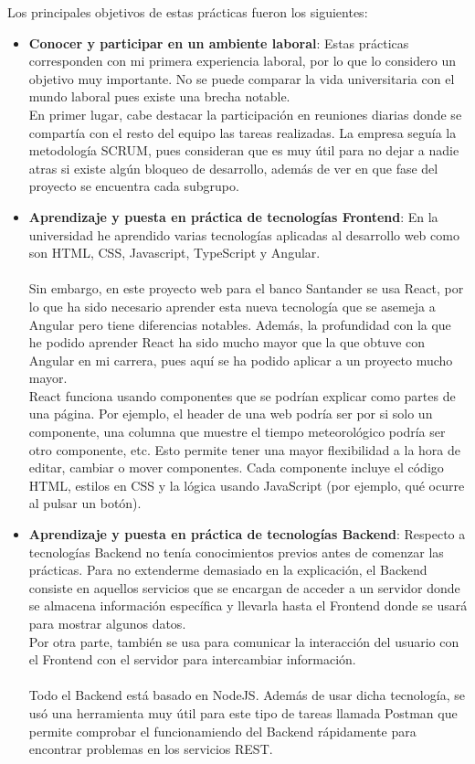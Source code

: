 \documentclass[a4paper,12pt]{article}
\begin{document}
Los principales objetivos de estas prácticas fueron los siguientes:
\begin{itemize}
\item \textbf{Conocer y participar en un ambiente laboral}: Estas prácticas corresponden con mi primera experiencia laboral, por lo que lo considero un objetivo muy importante. No se puede comparar la vida universitaria con el mundo laboral pues existe una brecha notable.\\

En primer lugar, cabe destacar la participación en reuniones diarias donde se compartía con el resto del equipo las tareas realizadas. La empresa seguía la metodología SCRUM, pues consideran que es muy útil para no dejar a nadie atras si existe algún bloqueo de desarrollo, además de ver en que fase del proyecto se encuentra cada subgrupo.

\item \textbf{Aprendizaje y puesta en práctica de tecnologías Frontend}:
En la universidad he aprendido varias tecnologías aplicadas al desarrollo web como son HTML, CSS, Javascript, TypeScript y
Angular. \\
\\Sin embargo, en este proyecto web para el banco Santander se usa React, por lo que ha sido necesario aprender esta nueva tecnología que se asemeja a Angular pero tiene diferencias notables. Además, la profundidad con la que he podido aprender React ha sido mucho mayor que la que obtuve con Angular en mi carrera, pues aquí se ha podido aplicar a un proyecto mucho mayor.\\
React funciona usando componentes que se podrían explicar como partes de una página. Por ejemplo, el header de una web podría ser por si solo un componente, una columna que muestre el tiempo meteorológico podría ser otro componente, etc. Esto permite tener una mayor flexibilidad a la hora de editar, cambiar o mover componentes. Cada componente incluye el código HTML, estilos en CSS y la lógica usando JavaScript (por ejemplo, qué ocurre al pulsar un botón).

\item \textbf{Aprendizaje y puesta en práctica de tecnologías Backend}:
Respecto a tecnologías Backend no tenía conocimientos previos antes de comenzar las prácticas. Para no extenderme demasiado en la explicación, el Backend consiste en aquellos servicios que se encargan de acceder a un servidor donde se almacena información específica y llevarla hasta el Frontend donde se usará para mostrar algunos datos.\\
Por otra parte, también se usa para comunicar la interacción del usuario con el Frontend con el servidor para intercambiar información.\\
\\
Todo el Backend está basado en NodeJS. Además de usar dicha tecnología, se usó una herramienta muy útil para este tipo de tareas llamada Postman que permite comprobar el funcionamiendo del Backend rápidamente para encontrar problemas en los servicios REST.


\end{itemize}
\end{document}
